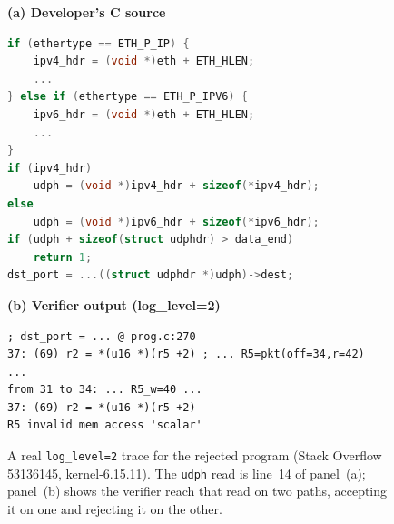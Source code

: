 \begin{figure}[t]
  \textbf{\footnotesize (a) Developer's C source}
  \begin{lstlisting}[style=bpfix,language=C,
      emph={udph},emphstyle={\color{lstbad}\bfseries},
      ]
if (ethertype == ETH_P_IP) {
    ipv4_hdr = (void *)eth + ETH_HLEN;
    ...
} else if (ethertype == ETH_P_IPV6) {
    ipv6_hdr = (void *)eth + ETH_HLEN;
    ...
}
if (ipv4_hdr)
    udph = (void *)ipv4_hdr + sizeof(*ipv4_hdr);
else
    udph = (void *)ipv6_hdr + sizeof(*ipv6_hdr);
if (udph + sizeof(struct udphdr) > data_end)
    return 1;
dst_port = ...((struct udphdr *)udph)->dest;
  \end{lstlisting}
  \vspace{3pt}
  \textbf{\footnotesize (b) Verifier output (log\_level=2)}
  \begin{lstlisting}[style=bpfix,
      emph={[1]pkt},emphstyle={[1]\color{lstgood}\bfseries},
      emph={[2]scalar},emphstyle={[2]\color{lstbad}\bfseries},
      ]
; dst_port = ... @ prog.c:270
37: (69) r2 = *(u16 *)(r5 +2) ; ... R5=pkt(off=34,r=42)
...
from 31 to 34: ... R5_w=40 ...
37: (69) r2 = *(u16 *)(r5 +2)
R5 invalid mem access 'scalar'
  \end{lstlisting}
  \caption{A real \texttt{log\_level=2} trace for the rejected program (Stack Overflow 53136145, kernel-6.15.11). The \texttt{udph} read is line~14 of panel~(a); panel~(b) shows the verifier reach that read on two paths, accepting it on one and rejecting it on the other.}
  \label{fig:motivating}
\end{figure}
